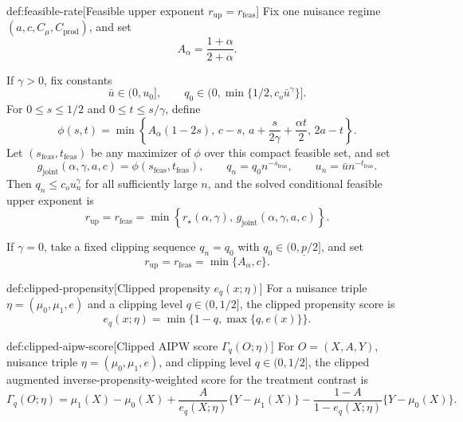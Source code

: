 \begin{definitionv}{def:feasible-rate}[Feasible upper exponent $r_{\mathrm{up}}=r_{\mathrm{feas}}$]
Fix one nuisance regime \((a,c,C_\mu,C_{\mathrm{prod}})\), and set
\[
A_\alpha=\frac{1+\alpha}{2+\alpha}.
\]

If \(\gamma>0\), fix constants
\[
\bar u\in(0,u_0],
\qquad
q_0\in\bigl(0,\min\{1/2,c_o\bar u^\gamma\}\bigr].
\]
For \(0\le s\le 1/2\) and \(0\le t\le s/\gamma\), define
\[
\phi(s,t)
=
\min\left\{
A_\alpha(1-2s),\,
c-s,\,
a+\frac{s}{2\gamma}+\frac{\alpha t}{2},\,
2a-t
\right\}.
\]
Let \((s_{\mathrm{feas}},t_{\mathrm{feas}})\) be any maximizer of \(\phi\) over this compact feasible set, and set
\[
g_{\mathrm{joint}}(\alpha,\gamma,a,c)
=
\phi(s_{\mathrm{feas}},t_{\mathrm{feas}}),
\qquad
q_n=q_0 n^{-s_{\mathrm{feas}}},
\qquad
u_n=\bar u n^{-t_{\mathrm{feas}}}.
\]
Then \(q_n\le c_o u_n^\gamma\) for all sufficiently large \(n\), and the solved conditional feasible upper exponent is
\[
r_{\mathrm{up}}
=
r_{\mathrm{feas}}
=
\min\left\{r_\star(\alpha,\gamma),\,g_{\mathrm{joint}}(\alpha,\gamma,a,c)\right\}.
\]

If \(\gamma=0\), take a fixed clipping sequence \(q_n=q_0\) with \(q_0\in(0,\underline p/2]\), and set
\[
r_{\mathrm{up}}
=
r_{\mathrm{feas}}
=
\min\{A_\alpha,c\}.
\]
\end{definitionv}

\begin{definitionv}{def:clipped-propensity}[Clipped propensity $e_q(x;\eta)$]
For a nuisance triple \(\eta=(\mu_0,\mu_1,e)\) and a clipping level \(q\in(0,1/2]\), the clipped propensity score is
\[
e_q(x;\eta)
=
\min\{1-q,\max\{q,e(x)\}\}.
\]
\end{definitionv}

\begin{definitionv}{def:clipped-aipw-score}[Clipped AIPW score $\Gamma_q(O;\eta)$]
For \(O=(X,A,Y)\), nuisance triple \(\eta=(\mu_0,\mu_1,e)\), and clipping level \(q\in(0,1/2]\), the clipped augmented inverse-propensity-weighted score for the treatment contrast is
\[
\Gamma_q(O;\eta)
=
\mu_1(X)-\mu_0(X)
+
\frac{A}{e_q(X;\eta)}\{Y-\mu_1(X)\}
-
\frac{1-A}{1-e_q(X;\eta)}\{Y-\mu_0(X)\}.
\]
\end{definitionv}

